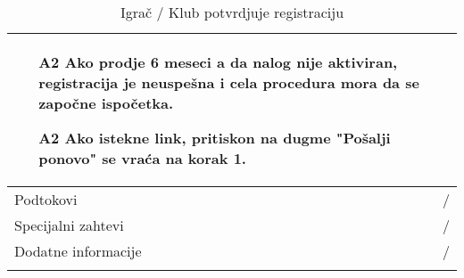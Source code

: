 \documentclass{article}
\begin{document}
\begin{longtable}{| p{} | p{} |}
\begin{enumerate}
                    \item[A2] Ako prodje 6 meseci a da nalog nije aktiviran, registracija je neuspešna i cela procedura mora da se započne ispočetka. 
                    \item[A2] Ako istekne link, pritiskon na dugme "Pošalji ponovo" se vraća na korak 1.
                \end{enumerate}\\
            \hline
                Podtokovi & /\\
            \hline
                Specijalni zahtevi & /\\
            \hline
                Dodatne informacije & / \\
            \hline
            \caption{Igrač / Klub potvrdjuje registraciju}
        \end{longtable}
\end{document}
